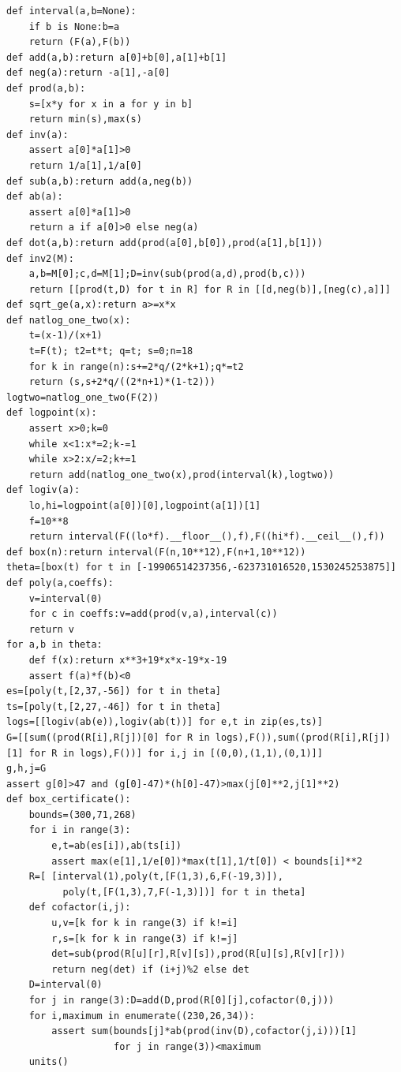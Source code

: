 \documentclass[11pt,a4paper,oneside,openany]{book}
\begin{document}
\begin{Verbatim}[fontsize=\footnotesize,breaklines,breakanywhere]
def interval(a,b=None):
    if b is None:b=a
    return (F(a),F(b))
def add(a,b):return a[0]+b[0],a[1]+b[1]
def neg(a):return -a[1],-a[0]
def prod(a,b):
    s=[x*y for x in a for y in b]
    return min(s),max(s)
def inv(a):
    assert a[0]*a[1]>0
    return 1/a[1],1/a[0]
def sub(a,b):return add(a,neg(b))
def ab(a):
    assert a[0]*a[1]>0
    return a if a[0]>0 else neg(a)
def dot(a,b):return add(prod(a[0],b[0]),prod(a[1],b[1]))
def inv2(M):
    a,b=M[0];c,d=M[1];D=inv(sub(prod(a,d),prod(b,c)))
    return [[prod(t,D) for t in R] for R in [[d,neg(b)],[neg(c),a]]]
def sqrt_ge(a,x):return a>=x*x
def natlog_one_two(x):
    t=(x-1)/(x+1)
    t=F(t); t2=t*t; q=t; s=0;n=18
    for k in range(n):s+=2*q/(2*k+1);q*=t2
    return (s,s+2*q/((2*n+1)*(1-t2)))
logtwo=natlog_one_two(F(2))
def logpoint(x):
    assert x>0;k=0
    while x<1:x*=2;k-=1
    while x>2:x/=2;k+=1
    return add(natlog_one_two(x),prod(interval(k),logtwo))
def logiv(a):
    lo,hi=logpoint(a[0])[0],logpoint(a[1])[1]
    f=10**8
    return interval(F((lo*f).__floor__(),f),F((hi*f).__ceil__(),f))
def box(n):return interval(F(n,10**12),F(n+1,10**12))
theta=[box(t) for t in [-19906514237356,-623731016520,1530245253875]]
def poly(a,coeffs):
    v=interval(0)
    for c in coeffs:v=add(prod(v,a),interval(c))
    return v
for a,b in theta:
    def f(x):return x**3+19*x*x-19*x-19
    assert f(a)*f(b)<0
es=[poly(t,[2,37,-56]) for t in theta]
ts=[poly(t,[2,27,-46]) for t in theta]
logs=[[logiv(ab(e)),logiv(ab(t))] for e,t in zip(es,ts)]
G=[[sum((prod(R[i],R[j])[0] for R in logs),F()),sum((prod(R[i],R[j])[1] for R in logs),F())] for i,j in [(0,0),(1,1),(0,1)]]
g,h,j=G
assert g[0]>47 and (g[0]-47)*(h[0]-47)>max(j[0]**2,j[1]**2)
def box_certificate():
    bounds=(300,71,268)
    for i in range(3):
        e,t=ab(es[i]),ab(ts[i])
        assert max(e[1],1/e[0])*max(t[1],1/t[0]) < bounds[i]**2
    R=[ [interval(1),poly(t,[F(1,3),6,F(-19,3)]),
          poly(t,[F(1,3),7,F(-1,3)])] for t in theta]
    def cofactor(i,j):
        u,v=[k for k in range(3) if k!=i]
        r,s=[k for k in range(3) if k!=j]
        det=sub(prod(R[u][r],R[v][s]),prod(R[u][s],R[v][r]))
        return neg(det) if (i+j)%2 else det
    D=interval(0)
    for j in range(3):D=add(D,prod(R[0][j],cofactor(0,j)))
    for i,maximum in enumerate((230,26,34)):
        assert sum(bounds[j]*ab(prod(inv(D),cofactor(j,i)))[1]
                   for j in range(3))<maximum
    units()


\end{Verbatim}
\end{document}
